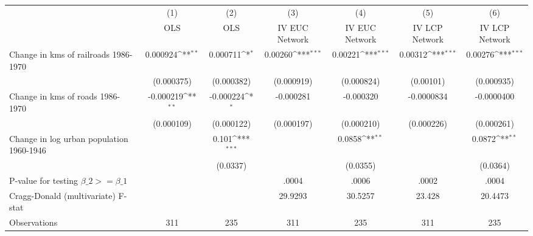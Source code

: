 {
\def\sym#1{\ifmmode^{#1}\else\(^{#1}\)\fi}
\begin{tabular}{l*{6}{c}}
\hline\hline
                &\multicolumn{1}{c}{(1)}&\multicolumn{1}{c}{(2)}&\multicolumn{1}{c}{(3)}&\multicolumn{1}{c}{(4)}&\multicolumn{1}{c}{(5)}&\multicolumn{1}{c}{(6)}\\
                &\multicolumn{1}{c}{OLS}&\multicolumn{1}{c}{OLS}&\multicolumn{1}{c}{IV EUC Network}&\multicolumn{1}{c}{IV EUC Network}&\multicolumn{1}{c}{IV LCP Network}&\multicolumn{1}{c}{IV LCP Network}\\
\hline
Change in kms of railroads 1986-1970& 0.000924\sym{**} & 0.000711\sym{*}  &  0.00260\sym{***}&  0.00221\sym{***}&  0.00312\sym{***}&  0.00276\sym{***}\\
                &(0.000375)         &(0.000382)         &(0.000919)         &(0.000824)         &(0.00101)         &(0.000935)         \\
[1em]
Change in kms of roads 1986-1970&-0.000219\sym{**} &-0.000224\sym{*}  &-0.000281         &-0.000320         &-0.0000834         &-0.0000400         \\
                &(0.000109)         &(0.000122)         &(0.000197)         &(0.000210)         &(0.000226)         &(0.000261)         \\
[1em]
Change in log urban population 1960-1946&                  &    0.101\sym{***}&                  &   0.0858\sym{**} &                  &   0.0872\sym{**} \\
                &                  & (0.0337)         &                  & (0.0355)         &                  & (0.0364)         \\
\hline
P-value for testing $\beta\_{2} >= \beta\_{1}$&                  &                  &    .0004         &    .0006         &    .0002         &    .0004         \\
Cragg-Donald (multivariate) F-stat&                  &                  &  29.9293         &  30.5257         &   23.428         &  20.4473         \\
Observations    &      311         &      235         &      311         &      235         &      311         &      235         \\
\hline\hline
\end{tabular}
}
